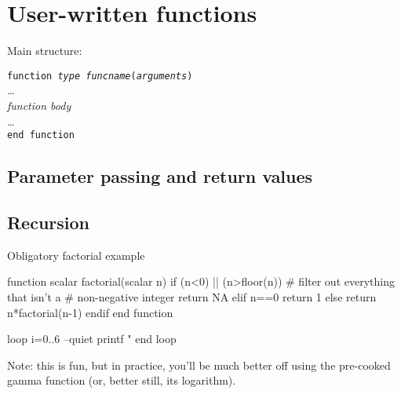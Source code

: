 \chapter{User-written functions}

Main structure:

\begin{flushleft}
\texttt{function \emph{type} \emph{funcname}(\emph{arguments})}\\
   \quad \ldots\\
   \quad \emph{function body}\\
   \quad \ldots \\
\texttt{end function}
\end{flushleft}
\section{Parameter passing and return values}
\label{sec:params-returns}



\section{Recursion}

Obligatory factorial example
\begin{code}
function scalar factorial(scalar n)
    if (n<0) || (n>floor(n))
        # filter out everything that isn't a 
        # non-negative integer
        return NA
    elif n==0
        return 1
    else
        return n*factorial(n-1)
    endif
end function

loop i=0..6 --quiet
    printf "%
end loop
\end{code}

Note: this is fun, but in practice, you'll be much better off using
the pre-cooked gamma function (or, better still, its logarithm).

